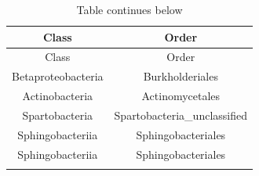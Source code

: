 \documentclass[]{article}
\begin{document}
\begin{longtable}[]{@{}cc@{}}
\caption{Table continues below}\tabularnewline
\toprule
\begin{minipage}[b]{0.38\columnwidth}\centering
Class\strut
\end{minipage} & \begin{minipage}[b]{0.39\columnwidth}\centering
Order\strut
\end{minipage}\tabularnewline
\midrule
\endfirsthead
\toprule
\begin{minipage}[b]{0.38\columnwidth}\centering
Class\strut
\end{minipage} & \begin{minipage}[b]{0.39\columnwidth}\centering
Order\strut
\end{minipage}\tabularnewline
\midrule
\endhead
\begin{minipage}[t]{0.38\columnwidth}\centering
Betaproteobacteria\strut
\end{minipage} & \begin{minipage}[t]{0.39\columnwidth}\centering
Burkholderiales\strut
\end{minipage}\tabularnewline
\begin{minipage}[t]{0.38\columnwidth}\centering
Actinobacteria\strut
\end{minipage} & \begin{minipage}[t]{0.39\columnwidth}\centering
Actinomycetales\strut
\end{minipage}\tabularnewline
\begin{minipage}[t]{0.38\columnwidth}\centering
Spartobacteria\strut
\end{minipage} & \begin{minipage}[t]{0.39\columnwidth}\centering
Spartobacteria\_unclassified\strut
\end{minipage}\tabularnewline
\begin{minipage}[t]{0.38\columnwidth}\centering
Sphingobacteriia\strut
\end{minipage} & \begin{minipage}[t]{0.39\columnwidth}\centering
Sphingobacteriales\strut
\end{minipage}\tabularnewline
\begin{minipage}[t]{0.38\columnwidth}\centering
Sphingobacteriia\strut
\end{minipage} & \begin{minipage}[t]{0.39\columnwidth}\centering
Sphingobacteriales\strut
\end{minipage}\tabularnewline
\begin{minipage}[t]{0.38\columnwidth}\centering

\end{minipage}
\end{longtable}
\end{document}
